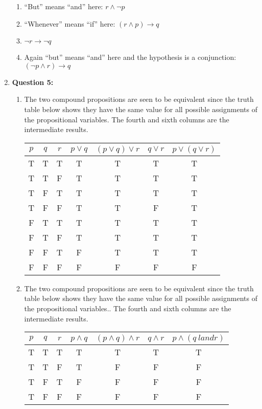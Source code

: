 \documentclass[11pt]{article}
\begin{document}
\begin{enumerate}
\begin{enumerate}[label=(\alph*)]
\item ``But'' means ``and'' here: $r \land \lnot p$
\item ``Whenever'' means ``if'' here: $(r \land p) \rightarrow q$
\item $\lnot r \rightarrow \lnot q$
\item Again ``but'' means ``and'' here and the hypothesis is a conjunction: $(\lnot
p \land r) \rightarrow q$
\end{enumerate}
\item
\textbf{Question 5:}
\begin{enumerate}[label=(\alph*)]
\item
The two compound propositions are seen to be equivalent since the truth table below
shows they have the same value for all possible assignments of the propositional
variables. The fourth and sixth columns are the intermediate results.
\begin{center}
\begin{tabular}{|c|c|c|c|c|c|c|}
\hline
$p$ & $q$ & $r$ & $p \lor q$ & $(p \lor q) \lor r$ & $q \lor r$ & $p \lor (q \lor
r)$\\
\hline
T & T & T & T & T & T & T\\
T & T & F & T & T & T & T\\
T & F & T & T & T & T & T\\
T & F & F & T & T & F & T\\
F & T & T & T & T & T & T\\
F & T & F & T & T & T & T\\
F & F & T & F & T & T & T\\
F & F & F & F & F & F & F\\
\hline
\end{tabular}
\end{center}
\item
The two compound propositions are seen to be equivalent since the truth table below
shows they have the same value for all possible assignments of the propositional
variables.. The fourth and sixth columns are the intermediate results.
\begin{center}
\begin{tabular}{|c|c|c|c|c|c|c|}
\hline
$p$ & $q$ & $r$ & $p \land q$ & $(p \land q) \land r$ & $q \land r$ & $p \land (q \
land r)$\\
\hline
T & T & T & T & T & T & T\\
T & T & F & T & F & F & F\\
T & F & T & F & F & F & F\\
T & F & F & F & F & F & F\\

\end{tabular}
\end{center}
\end{enumerate}
\end{enumerate}
\end{document}
